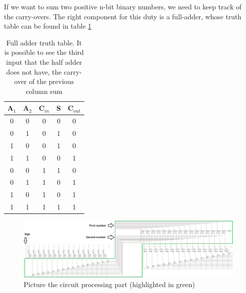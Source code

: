 \documentclass{article}
\begin{document}
If we want to sum two positive n-bit binary numbers, we need to keep track of the carry-overs. The right component for this duty is a full-adder, whose truth table can be found in table \ref{FullAdderTT}

\begin{table}[h]
  \centering
  \begin{tabular}{| c | c | c || c | c |}
  \hline
  A$_1$ & A$_2$ & C$_{in}$ & S & C$_{out}$ \\ \hline
  0 & 0 & 0 & 0 & 0 \\ \hline
  0 & 1 & 0 & 1 & 0 \\ \hline
  1 & 0 & 0 & 1 & 0 \\ \hline
  1 & 1 & 0 & 0 & 1 \\ \hline
  0 & 0 & 1 & 1 & 0 \\ \hline
  0 & 1 & 1 & 0 & 1 \\ \hline
  1 & 0 & 1 & 0 & 1 \\ \hline
  1 & 1 & 1 & 1 & 1 \\ \hline
  \end{tabular}
  \caption{Full adder truth table. It is possible to see the third input that the half adder does not have, the carry-over of the previous column sum}
  \label{FullAdderTT}
\end{table}







\begin{table}
  
\end{table}



















\clearpage
\begin{figure}[h]
  \centering
  \includegraphics[scale=0.43]{SC_Processing_Total.JPG}
  \caption{Picture the circuit processing part (highlighted in green)}
  \label{Processing_Total}
\end{figure}
\end{document}
